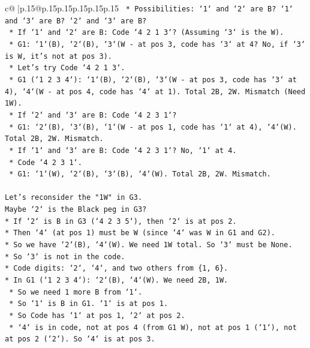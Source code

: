 \documentclass{article}
\begin{document}
{\begin{supertabular}{c@{$\;$}|p{.15\linewidth}@{}p{.15\linewidth}p{.15\linewidth}p{.15\linewidth}p{.15\linewidth}p{.15\linewidth}}
{{{\texttt{        *   Possibilities: `1` and `2` are B? `1` and `3` are B? `2` and `3` are B?} \\
\texttt{        *   If `1` and `2` are B: Code `4 2 1 3`? (Assuming `3` is the W).} \\
\texttt{            *   G1: `1`(B), `2`(B), `3`(W {-} at pos 3, code has `3` at 4? No, if `3` is W, it's not at pos 3).} \\
\texttt{            *   Let's try Code `4 2 1 3`.} \\
\texttt{                *   G1 (`1 2 3 4`): `1`(B), `2`(B), `3`(W {-} at pos 3, code has `3` at 4), `4`(W {-} at pos 4, code has `4` at 1). Total 2B, 2W. Mismatch (Need 1W).} \\
\texttt{        *   If `2` and `3` are B: Code `4 2 3 1`?} \\
\texttt{            *   G1: `2`(B), `3`(B), `1`(W {-} at pos 1, code has `1` at 4), `4`(W). Total 2B, 2W. Mismatch.} \\
\texttt{        *   If `1` and `3` are B: Code `4 2 3 1`? No, `1` at 4.} \\
\texttt{            *   Code `4 2 3 1`.} \\
\texttt{            *   G1: `1`(W), `2`(B), `3`(B), `4`(W). Total 2B, 2W. Mismatch.} \\
\\ 
\texttt{Let's reconsider the "1W" in G3.} \\
\texttt{Maybe `2` is the Black peg in G3?} \\
\texttt{*   If `2` is B in G3 (`4 2 3 5`), then `2` is at pos 2.} \\
\texttt{*   Then `4` (at pos 1) must be W (since `4` was W in G1 and G2).} \\
\texttt{*   So we have `2`(B), `4`(W). We need 1W total. So `3` must be None.} \\
\texttt{*   So `3` is not in the code.} \\
\texttt{*   Code digits: `2`, `4`, and two others from \{1, 6\}.} \\
\texttt{*   In G1 (`1 2 3 4`): `2`(B), `4`(W). We need 2B, 1W.} \\
\texttt{    *   So we need 1 more B from `1`.} \\
\texttt{    *   So `1` is B in G1. `1` is at pos 1.} \\
\texttt{    *   So Code has `1` at pos 1, `2` at pos 2.} \\
\texttt{    *   `4` is in code, not at pos 4 (from G1 W), not at pos 1 (`1`), not at pos 2 (`2`). So `4` is at pos 3.} \\
}}}
\end{supertabular}}
\end{document}
